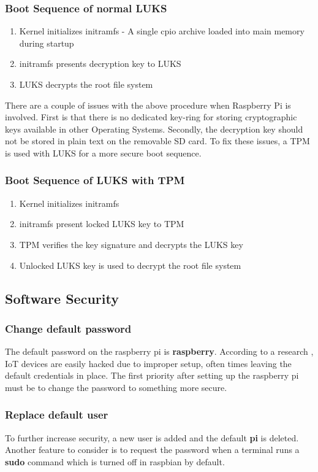 \documentclass[11pt,openright]{report}
\begin{document}
\subsubsection{Boot Sequence of normal LUKS}
\begin{enumerate}
	\item Kernel initializes initramfs - A single cpio archive loaded into main memory during startup
	\item initramfs presents decryption key to LUKS
	\item LUKS decrypts the root file system
\end{enumerate}

There are a couple of issues with the above procedure when Raspberry Pi is involved. First is that there is no dedicated key-ring for storing cryptographic keys available in other Operating Systems. Secondly, the decryption key should not be stored in plain text on the removable SD card. To fix these issues, a TPM is used with LUKS for a more secure boot sequence.

\subsubsection{Boot Sequence of LUKS with TPM}
\begin{enumerate}
	\item Kernel initializes initramfs
	\item initramfs present locked LUKS key to TPM
	\item TPM verifies the key signature and decrypts the LUKS key
	\item Unlocked LUKS key is used to decrypt the root file system
\end{enumerate}

\subsection{Software Security}
\subsubsection{Change default password}
The default password on the raspberry pi is \textbf{raspberry}. According to a research \cite{8364059}, IoT devices are easily hacked due to improper setup, often times leaving the default credentials in place. The first priority after setting up the raspberry pi must be to change the password to something more secure.

\subsubsection{Replace default user}
To further increase security, a new user is added and the default \textbf{pi} is deleted. Another feature to consider is to request the password when a terminal runs a \textbf{sudo} command which is turned off in raspbian by default.
\end{document}
